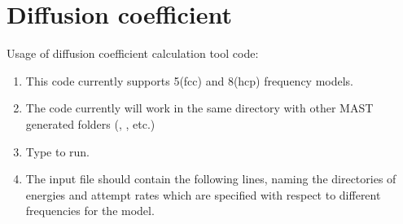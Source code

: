 \documentclass[letterpaper,10pt,english]{sphinxmanual}
\begin{document}
\section{Diffusion coefficient}
\label{6_0_tools:diffusion-coefficient}
Usage of diffusion coefficient calculation tool code:
\begin{enumerate}
\item {} 
This code currently supports 5(fcc) and 8(hcp) frequency models.

\item {} 
The code currently will work in the same directory with other MAST generated folders (, , etc.)

\item {} 
Type  to run.

\item {} 
The input file should contain the following lines, naming the directories of energies and attempt rates which are specified with respect to different frequencies for the model.

\end{enumerate}
\end{document}
